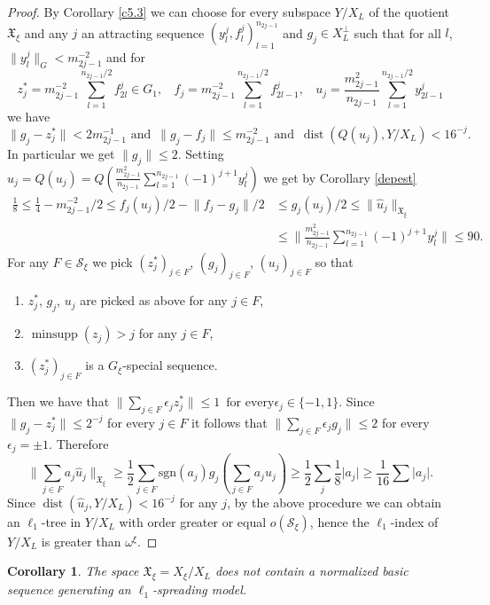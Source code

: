 \documentclass[a4paper]{amsart}
\theoremstyle{plain}
\newtheorem{corollary}[theorem]{Corollary}
\newcommand{\mc}{\mathcal}
\newcommand{\e}{\epsilon}
\newcommand{\norm}[1][\cdot]{\lVert #1\rVert}
\DeclareMathOperator{\minsupp}{minsupp}
\DeclareMathOperator{\dist}{dist}
\begin{document}
\begin{proof}
By Corollary \ref{c5.3}  we  can choose for every subspace $Y/X_L$ of the quotient
$\mathfrak{X}_{\xi}$ and any $j$ an attracting sequence
$(y^{j}_{l},f^{j}_{l})_{l=1}^{n_{2j-1}}$ and $g_{j}\in X_L^{\perp}$ such that for all
$l$, $\norm[y_l^j]_G<m_{2j-1}^{-2}$ and for
$$
z^{*}_{j}=m_{2j-1}^{-2}\sum_{l=1}^{n_{2j-1}/2}f^{j}_{2l}\in G_1,\
\ \ \
f_j=m_{2j-1}^{-2}\sum_{l=1}^{n_{2j-1}/2}f_{2l-1}^{j}, \ \
\ \
u_j=\frac{m_{2j-1}^{2}}{n_{2j-1}}\sum_{l=1}^{n_{2j-1}/2}y^{j}_{2l-1}
$$
we have
$$
\norm[g_{j}-z_{j}^{*}]<2m_{2j-1}^{-1}\,\,\textrm{and}\,\,\,
\norm[g_{j}-f_j]\leq m_{2j-1}^{-2}\,\,\textrm{and}\,\,\, \dist
(Q(u_j),Y/X_L)< 16^{-j}.
$$
In particular we get $\norm[g_j]\leq 2$. Setting
$\widehat{u}_{j}=Q(u_j) =
Q(\frac{m_{2j-1}^{2}}{n_{2j-1}}\sum_{l=1}^{n_{2j-1}}(-1)^{j+1}y^{j}_{l})
$ we get by Corollary \ref{depest}
\begin{align*}
\frac{1}{8}\leq\frac{1}{4}-m_{2j-1}^{-2}/2\leq f_{j}(u_{j})/2-\norm[f_j-g_j]/2 &\leq
g_{j}(u_{j})/2\leq\norm[\widehat{u}_{j}]_{\mathfrak{X}_\xi}
\\
&\leq
\|\frac{m_{2j-1}^{2}}{n_{2j-1}}\sum\limits_{l=1}^{n_{2j-1}}(-1)^{j+1}y^{j}_{l}\|\leq
90.
\end{align*}
For any $F\in \mc{S}_\xi$ we pick $(z_j^*)_{j\in F}$, $(g_j)_{j\in
F}$, $(u_j)_{j\in F}$ so that
\begin{enumerate}
\item $z_j^*$, $g_j$, $u_j$ are picked as above for any $j\in F$,
\item $\minsupp (z_j)>j$ for any $j\in F$,
\item $(z_j^*)_{j\in F}$ is a $G_{\xi}$-special sequence.
\end{enumerate}
Then we have that
$
\|\sum_{j\in F}\e_{j}z_{j}^{*}\|\leq 1\,\,\,\textrm{for every
$\e_{j}\in\{-1,1\}$}.
$
Since  $\norm[g_j-z^{*}_j]\leq 2^{-j}$ for every $j\in F$ it follows that
$\norm[\sum_{j\in F}\e_{j}g_{j}]\leq 2$ for every $\e_{j}=\pm 1$. Therefore
$$
\|\sum_{j\in F}a_j\widehat{u}_{j}\|_{\mathfrak{X}_\xi}\geq\frac{1}{2} \sum_{j\in
F}\textrm{sgn}(a_j)g_{j}(\sum_{j\in F}a_ju_{j})\geq \frac{1}{2}\sum_{j}\frac{1}{8}\vert
a_j\vert\geq \frac{1}{16}\sum\vert a_j\vert.
$$
Since $\dist (\widehat{u}_j,Y/X_L)< 16^{-j}$ for any $j$, by the above procedure we can
obtain an $\ell_{1}$-tree in $Y/X_L$ with order greater or equal $o(\mc{S}_\xi)$, hence the
 $\ell_{1}$-index of $Y/X_L$ is greater than $\omega^{\xi}$.
\end{proof}
\begin{corollary}\label{clast}
The space $\mathfrak{X}_{\xi}=X_{\xi}/X_{L}$ does not contain a normalized basic
sequence generating an $\ell_{1}$-spreading model.
\end{corollary}
\end{document}
